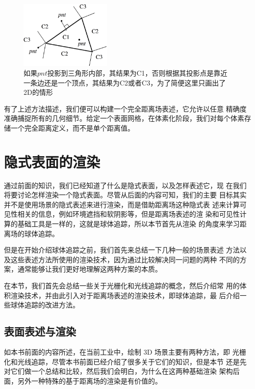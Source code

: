 \begin{figure}
	\sidecaption
	\includegraphics[width=0.4\textwidth]{figures/df/complete-distance-definition}
	\caption{如果$pnt$投影到三角形内部，其结果为C1，否则根据其投影点是靠近一条边还是一个顶点，其结果为C2或者C3，为了简便这里只画出了2D的情形}
	\label{f:df-complete-distance-definition}
\end{figure}

有了上述方法描述，我们便可以构建一个完全距离场表述，它允许以任意 精确度准确捕捉所有的几何细节。给定一个表面网格，在体素化阶段，我们对每个体素存储一个完全距离定义，而不是单个距离值。




\section{隐式表面的渲染}\label{sec:df-rendering-of-implicit}
通过前面的知识，我们已经知道了什么是隐式表面，以及怎样表述它，现 在我们将要讨论怎样渲染一个隐式表面。尽管从后面的内容可知，我们的主要 目标其实并不是使用场景的隐式表述来进行渲染，而是借助距离场这种隐式表 述来计算可见性相关的信息，例如环境遮挡和软阴影等，但是距离场表述的渲 染和可见性计算的基础工具是一样的，这就是球体追踪，所以本节首先从渲染 的角度来学习距离场的球体追踪。

但是在开始介绍球体追踪之前，我们首先来总结一下几种一般的场景表述 方法以及这些表述方法所使用的渲染技术，因为通过比较解决同一问题的两种 不同的方案，通常能够让我们更好地理解这两种方案的本质。

在本节，我们首先会总结一些关于光栅化和光线追踪的概念，然后介绍常 用的体积渲染技术，并由此引入对于距离场表述的渲染技术，即球体追踪，最 后介绍一些球体追踪的改进方法。




\subsection{表面表述与渲染}
如本书前面的内容所述，在当前工业中，绘制 3D 场景主要有两种方法，即 光栅化和光线追踪，尽管本书前面已经介绍了很多关于它们的知识，但是本节 还是先对它们做一个总结和比较，然后我们会明白，为什么在这两种基础渲染 架构后面，另外一种特殊的基于距离场的渲染是有价值的。

